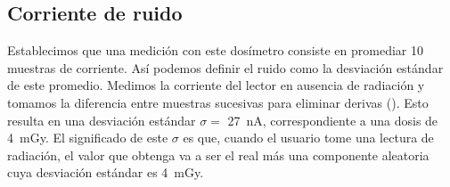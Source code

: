 \subsection{Corriente de ruido}
Establecimos que una medición con este dosímetro consiste en promediar 10
muestras de corriente.
Así podemos definir el ruido como la desviación estándar de este promedio.
Medimos la corriente del lector en ausencia de radiación y
tomamos la diferencia entre muestras sucesivas para eliminar derivas
().
Esto resulta en una desviación estándar
$\sigma=$ \SI{27}{\nano\ampere},
correspondiente a una dosis de \SI{4}{\milli\gray}.
El significado de este $\sigma$ es que,
cuando el usuario tome una lectura de radiación,
el valor que obtenga va a ser el real más una componente aleatoria
cuya desviación estándar es \SI{4}{\milli\gray}.
